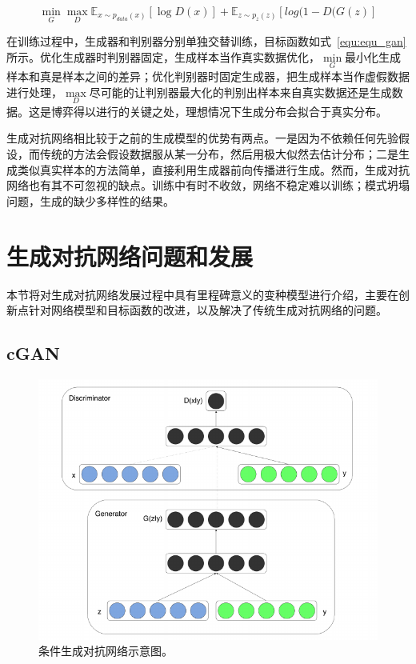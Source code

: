 \begin{equation}
\label{equ:equ_gan}
\mathop{min} \limits_{G} \mathop{max} \limits_{D} \mathbb{E}_{x \sim p_{data}(x)}[\log D(x)] + \mathbb{E}_{z \sim p_{z}(z)}[log(1-D(G(z)]
\end{equation}

在训练过程中，生成器和判别器分别单独交替训练，目标函数如式~\ref{equ:equ_gan}所示。优化生成器时判别器固定，生成样本当作真实数据优化，$\min \limits_{G}$最小化生成样本和真是样本之间的差异；优化判别器时固定生成器，把生成样本当作虚假数据进行处理，$\max \limits_{D}$尽可能的让判别器最大化的判别出样本来自真实数据还是生成数据。这是博弈得以进行的关键之处，理想情况下生成分布会拟合于真实分布。

生成对抗网络相比较于之前的生成模型的优势有两点。一是因为不依赖任何先验假设，而传统的方法会假设数据服从某一分布，然后用极大似然去估计分布；二是生成类似真实样本的方法简单，直接利用生成器前向传播进行生成。然而，生成对抗网络也有其不可忽视的缺点。训练中有时不收敛，网络不稳定难以训练；模式坍塌问题，生成的缺少多样性的结果。

\section{生成对抗网络问题和发展}
本节将对生成对抗网络发展过程中具有里程碑意义的变种模型进行介绍，主要在创新点针对网络模型和目标函数的改进，以及解决了传统生成对抗网络的问题。
\subsection{cGAN}

\begin{figure}[ht]
    \centering
	\includegraphics[width=\textwidth]{figs/cgan.pdf}
	\caption{条件生成对抗网络示意图。}
	\label{fig:pic_cgan}
\end{figure}

